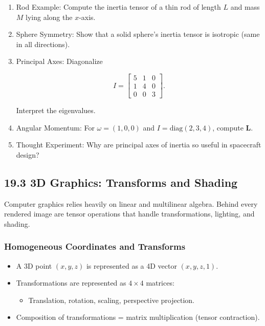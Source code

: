 \documentclass[
  letterpaper,
  DIV=11,
  numbers=noendperiod]{scrreprt}
\providecommand{\tightlist}{%
  \setlength{\itemsep}{0pt}\setlength{\parskip}{0pt}}
\begin{document}
\begin{enumerate}
\def\labelenumi{\arabic{enumi}.}
\item
  Rod Example: Compute the inertia tensor of a thin rod of length \(L\)
  and mass \(M\) lying along the \(x\)-axis.
\item
  Sphere Symmetry: Show that a solid sphere's inertia tensor is
  isotropic (same in all directions).
\item
  Principal Axes: Diagonalize

  \[
  I = \begin{bmatrix} 5 & 1 & 0 \\ 1 & 4 & 0 \\ 0 & 0 & 3 \end{bmatrix}.
  \]

  Interpret the eigenvalues.
\item
  Angular Momentum: For \(\omega = (1,0,0)\) and
  \(I = \mathrm{diag}(2,3,4)\), compute \(\mathbf{L}\).
\item
  Thought Experiment: Why are principal axes of inertia so useful in
  spacecraft design?
\end{enumerate}

\subsection{19.3 3D Graphics: Transforms and
Shading}\label{d-graphics-transforms-and-shading}

Computer graphics relies heavily on linear and multilinear algebra.
Behind every rendered image are tensor operations that handle
transformations, lighting, and shading.

\subsubsection{Homogeneous Coordinates and
Transforms}\label{homogeneous-coordinates-and-transforms}

\begin{itemize}
\item
  A 3D point \((x,y,z)\) is represented as a 4D vector \((x,y,z,1)\).
\item
  Transformations are represented as \(4 \times 4\) matrices:

  \begin{itemize}
  \tightlist
  \item
    Translation, rotation, scaling, perspective projection.
  \end{itemize}
\item
  Composition of transformations = matrix multiplication (tensor
  contraction).
\end{itemize}
\end{document}
